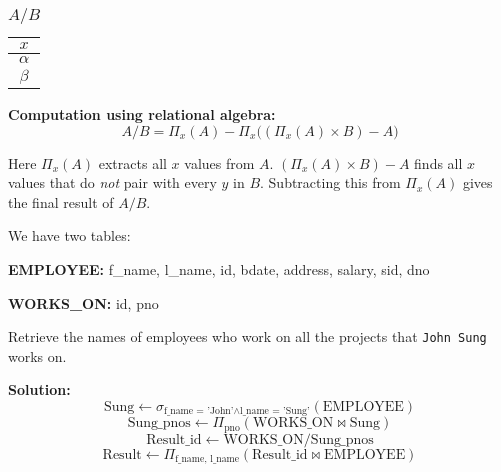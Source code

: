 \begin{minipage}{0.1\textwidth}
  \begin{table}[H]
  \centering
  \begin{tabular}{c}
      \toprule
      \(x\) \\
    \midrule
      \(\alpha\) \\
      \(\beta\) \\
      \bottomrule
  \end{tabular}
  \caption*{\(A / B\)}
\end{table}
\end{minipage}

\textbf{Computation using relational algebra:} 
\[
A / B = \Pi_x(A) - \Pi_x\big( (\Pi_x(A) \times B) - A \big)
\]

Here \(\Pi_x(A)\) extracts all \(x\) values from \(A\). \((\Pi_x(A) \times B) - A\) finds all \(x\) values that do \emph{not} pair with every \(y\) in \(B\). Subtracting this from \(\Pi_x(A)\) gives the final result of \(A / B\). 

\begin{eg}
  We have two tables: 

  \textbf{EMPLOYEE:} f\_name, l\_name, id, bdate, address, salary, sid, dno 

  \textbf{WORKS\_ON:} id, pno 

  Retrieve the names of employees who work on all the projects that \texttt{John Sung} works on.

  \textbf{Solution:} 
  \[
  \text{Sung} \leftarrow \sigma_{\text{f\_name = 'John'} \land \text{l\_name = 'Sung'}}(\text{EMPLOYEE})
  \]
  \[
  \text{Sung\_pnos} \leftarrow \Pi_{\text{pno}}(\text{WORKS\_ON} \Join \text{Sung})
  \]
  \[
  \text{Result\_id} \leftarrow \text{WORKS\_ON} / \text{Sung\_pnos}
  \]
  \[
  \text{Result} \leftarrow \Pi_{\text{f\_name, l\_name}}(\text{Result\_id} \Join \text{EMPLOYEE})
  \]
\end{eg}

